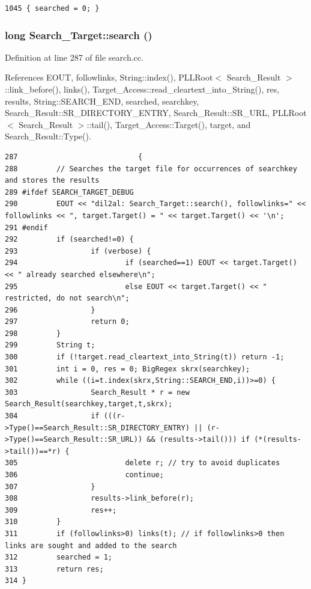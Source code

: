 \footnotesize\begin{verbatim}1045 { searched = 0; }
\end{verbatim}\normalsize 
{}
\subsubsection{\setlength{\rightskip}{0pt plus 5cm}long Search\_\-Target::search ()}\label{classSearch__Target_a3}




Definition at line 287 of file search.cc.

References EOUT, followlinks, String::index(), PLLRoot$<$ Search\_\-Result $>$::link\_\-before(), links(), Target\_\-Access::read\_\-cleartext\_\-into\_\-String(), res, results, String::SEARCH\_\-END, searched, searchkey, Search\_\-Result::SR\_\-DIRECTORY\_\-ENTRY, Search\_\-Result::SR\_\-URL, PLLRoot$<$ Search\_\-Result $>$::tail(), Target\_\-Access::Target(), target, and Search\_\-Result::Type().



\footnotesize\begin{verbatim}287                            {
288         // Searches the target file for occurrences of searchkey and stores the results
289 #ifdef SEARCH_TARGET_DEBUG
290         EOUT << "dil2al: Search_Target::search(), followlinks=" << followlinks << ", target.Target() = " << target.Target() << '\n';
291 #endif
292         if (searched!=0) {
293                 if (verbose) {
294                         if (searched==1) EOUT << target.Target() << " already searched elsewhere\n";
295                         else EOUT << target.Target() << " restricted, do not search\n";
296                 }
297                 return 0;
298         }
299         String t;
300         if (!target.read_cleartext_into_String(t)) return -1;
301         int i = 0, res = 0; BigRegex skrx(searchkey);
302         while ((i=t.index(skrx,String::SEARCH_END,i))>=0) {
303                 Search_Result * r = new Search_Result(searchkey,target,t,skrx);
304                 if (((r->Type()==Search_Result::SR_DIRECTORY_ENTRY) || (r->Type()==Search_Result::SR_URL)) && (results->tail())) if (*(results->tail())==*r) {
305                         delete r; // try to avoid duplicates
306                         continue;
307                 }
308                 results->link_before(r);
309                 res++;
310         }
311         if (followlinks>0) links(t); // if followlinks>0 then links are sought and added to the search
312         searched = 1;
313         return res;
314 }
\end{verbatim}\normalsize 
{}
